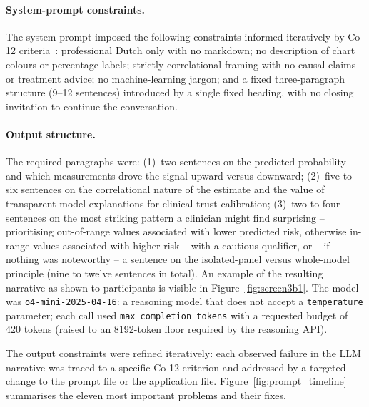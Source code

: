\documentclass[12pt, a4paper]{article}
\begin{document}
\paragraph*{System-prompt constraints.}
The system prompt imposed the following constraints informed
iteratively by Co-12 criteria~\citep{nauta2023anecdotal}: professional Dutch
only with no markdown; no description of chart colours or percentage
labels; strictly correlational framing with no causal claims or
treatment advice; no machine-learning jargon; and a fixed
three-paragraph structure (9--12 sentences) introduced by a single
fixed heading, with no closing invitation to continue the conversation.

\paragraph*{Output structure.}
The required paragraphs were: (1)~two sentences on the predicted probability
and which measurements drove the signal upward versus downward;
(2)~five to six sentences on the correlational nature of the estimate and
the value of transparent model explanations for clinical trust calibration;
(3)~two to four sentences on the most striking pattern a clinician might find
surprising -- prioritising out-of-range values associated with lower predicted
risk, otherwise in-range values associated with higher risk -- with a cautious
qualifier, or -- if nothing was noteworthy -- a sentence on the
isolated-panel versus whole-model principle (nine to twelve sentences in
total). An example of the resulting narrative as shown to
participants is visible in Figure~\ref{fig:screen3b1}. The model was
\texttt{o4-mini-2025-04-16}: a reasoning model that does not accept a
\texttt{temperature} parameter; each call used \texttt{max\_completion\_tokens}
with a requested budget of 420 tokens (raised to an 8192-token floor required
by the reasoning API).

The output constraints were refined iteratively: each observed failure in the
LLM narrative was traced to a specific Co-12 criterion and addressed by a
targeted change to the prompt file or the application file.
Figure~\ref{fig:prompt_timeline} summarises the eleven most important problems
and their fixes.
\end{document}

